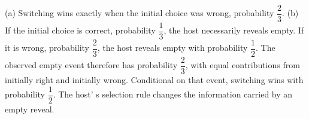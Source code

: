 (a) Switching wins exactly when the initial choice was wrong, probability $\boxed{\dfrac{2}{3}}$. (b) If the initial choice is correct, probability $\dfrac{1}{3}$, the host necessarily reveals empty. If it is wrong, probability $\dfrac{2}{3}$, the host reveals empty with probability $\dfrac{1}{2}$. The observed empty event therefore has probability $\dfrac{2}{3}$, with equal contributions from initially right and initially wrong. Conditional on that event, switching wins with probability $\boxed{\dfrac{1}{2}}$. The host' s selection rule changes the information carried by an empty reveal.

